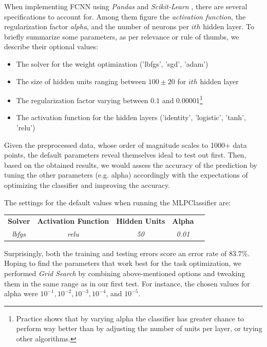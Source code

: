 When implementing FCNN using \emph{Pandas} \cite{pandasdataframe} and \emph{Scikit-Learn} \cite{scikitlearn}, there are several specifications to account for. Among them figure the
\emph{activation function}, the regularization factor \emph{alpha}, and the number of neurons per $ith$ hidden layer. To briefly
summarize some parameters, as per relevance or rule of thumbs, we describe their optional values:
\begin{itemize}
    \item The solver for the weight optimization ('lbfgs', 'sgd', 'adam')
    \item The size of hidden units ranging between $100 \pm 20$ for $ith$ hidden layer
    \item The regularization factor varying between $0.1$ and $0.00001$\footnote{Practice shows that
    by varying alpha the classifier has greater chance to perform way better than by adjusting the
    number of units per layer, or trying other algorithms.}
    \item The activation function for the hidden layers ('identity', 'logistic', 'tanh', 'relu')
\end{itemize}

Given the preprocessed data, whose order of magnitude scales to 1000+ data points, the default parameters
reveal themselves ideal to test out first. Then, based on the obtained results, we would assess the accuracy of
the prediction by tuning the other parameters (e.g. alpha) accordingly with the expectations of optimizing
the classifier and improving the accuracy.

The settings for the default values when running the MLPClassifier are: %
\begin{center}
    \begin{tabular}{ c c c c c }
    \textbf{Solver} & \textbf{Activation Function} & \textbf{Hidden Units}  &  \textbf{Alpha} \\
    \textit{lbfgs} & \textit{relu} & \textit{50} & \textit{0.01} \\
    \end{tabular}
\end{center}
Surprisingly, both the training and testing errors score an error rate of $83.7\%$. Hoping
to find the parameters that work best for the task optimization, we performed \emph{Grid Search} by combining
above-mentioned options and tweaking them in the same range as in our first test. For instance, the chosen
values for alpha were $10^{-1}, 10^{-2}, 10^{-3}, 10^{-4}$, and $10^{-5}$.

